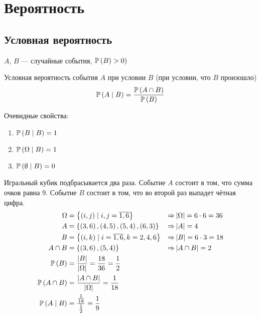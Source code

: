 \chapter{Вероятность}

\section{Условная вероятность}
$A$, $B$ --- случайные события, $\mathbb{P}\left( B \right)>0)$
\begin{definition}Условная вероятность события $A$ при условии $B$
    (при условии, что $B$ произошло)
    $$\mathbb{P}\left( A\mid B \right)
    =\frac{\mathbb{P}\left(A\cap B\right)}{\mathbb{P}\left( B \right)}$$
\end{definition}
Очевидные свойства:
\begin{enumerate}
    \item $\mathbb{P}\left( B\mid B \right)=1$
    \item $\mathbb{P}\left( \Omega\mid B \right)=1$
    \item $\mathbb{P}\left( \emptyset\mid B \right)=0$
\end{enumerate}

\begin{example}Игральный кубик подбрасывается два раза.
    Событие $A$ состоит в том, что сумма очков равна $9$.
    Событие $B$ состоит в том, что во второй раз выпадет чётная цифра.
    \begin{alignat*}{3}
        \Omega&=\left\{\left(i,j\right)\mid i,j=\overline{1,6}\right\}
        &\Rightarrow&\left|\Omega\right|=6\cdot 6=36\\
        A&=\left\{\left(3,6\right),\left(4,5\right),\left(5,4\right),
            \left(6,3\right)\right\}
        &\Rightarrow&\left|A\right|=4\\
        B&=\left\{\left(i,k\right)\mid i=\overline{1,6}, k=2,4,6\right\}
        &\Rightarrow&\left|B\right|=6\cdot 3=18\\
        A\cap B&=\left\{\left(3,6\right), \left(5,4\right)\right\}
        &\Rightarrow&\left|A\cap B\right|=2\\
        \mathbb{P}\left( B \right)&=\frac{\left|B\right|}{\left|\Omega\right|}
            =\frac{18}{36}=\frac{1}{2}\\
        \mathbb{P}\left( A\cap B \right)&=\frac{\left|A\cap B\right|}{\left|\Omega\right|}
            =\frac{1}{18}\\
        \mathbb{P}\left( A\mid B \right)&=\frac{\frac{1}{18}}{\frac{1}{2}}=\frac{1}{9}\\
    \end{alignat*}

\end{example}
